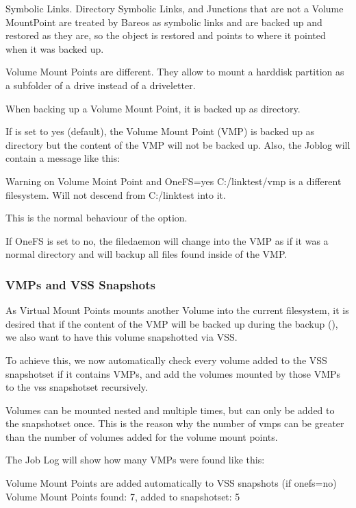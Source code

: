Symbolic Links. Directory Symbolic Links, and Junctions that are not a Volume MountPoint are treated by Bareos as symbolic links and are backed up and restored as they are, so the object is restored and points to where it pointed when it was backed up.

Volume Mount Points are different. They allow to mount a harddisk partition as a subfolder of a drive instead of a driveletter.

When backing up a Volume Mount Point, it is backed up as directory.

If  is set to yes (default), the Volume Mount Point (VMP) is backed up as directory but the content of the VMP will not be backed up. Also, the Joblog will contain a message like this:

\begin{bmessage}{Warning on Volume Moint Point and OneFS=yes}
C:/linktest/vmp is a different filesystem. Will not descend from C:/linktest into it.
\end{bmessage}

This is the normal behaviour of the  option. 

If OneFS is set to no, the filedaemon will change into the VMP as if it was a normal directory and will backup all files found inside of the VMP.


\subsubsection{VMPs and VSS Snapshots}

As Virtual Mount Points mounts another Volume into the current filesystem, it is desired that if the content of the VMP will be backed up during the backup (), we also want to have this volume snapshotted via VSS.

To achieve this, we now automatically check every volume added to the VSS snapshotset if it contains VMPs, and add the volumes mounted by those VMPs to the vss snapshotset recursively.

Volumes can be mounted nested and multiple times, but can only be added to the snapshotset once. This is the reason why the number of vmps can be greater than the number of volumes added for the volume mount points.

The Job Log will show how many VMPs were found like this:

\begin{bmessage}{Volume Mount Points are added automatically to VSS snapshots (if onefs=no)}
Volume Mount Points found: 7, added to snapshotset: 5
\end{bmessage}

